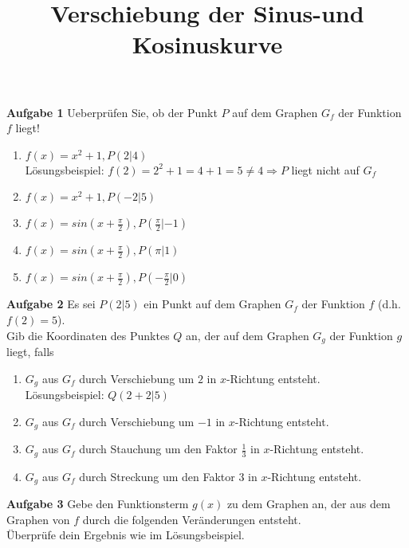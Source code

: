 \documentclass[11pt]{article}
\title{ Verschiebung der Sinus-und Kosinuskurve }
\begin{document}
\maketitle

\textbf{Aufgabe 1} Ueberpr\"ufen Sie, ob der Punkt $P$ auf dem Graphen $G_f$ der Funktion $f$ liegt!
\begin{enumerate}[label=(\alph*)]
\item $f(x)=x^2+1, P(2|4)$ \\
L\"osungsbeispiel: $f(2) = 2^2+1=4+1=5 \neq 4 \Rightarrow P$ liegt nicht auf $G_f$ 
\item $f(x)=x^2+1, P(-2|5)$ 
\item $f(x)=sin\left( x + \frac{\pi}{2} \right), P\left( \frac{\pi}{2} | -1 \right)$
\item $f(x)=sin\left( x + \frac{\pi}{2} \right), P\left( \pi | 1 \right)$
\item $f(x)=sin\left( x + \frac{\pi}{2} \right), P\left( -\frac{\pi}{2} | 0 \right)$
\end{enumerate}

\textbf{Aufgabe 2} Es sei $P(2|5)$ ein Punkt auf dem Graphen $G_f$ der Funktion $f$ (d.h. $f(2)=5$). \\
Gib die Koordinaten des Punktes $Q$ an, der auf dem Graphen $G_g$ der Funktion $g$ liegt, falls
\begin{enumerate}[label=(\alph*)]
\item $G_g$ aus $G_f$ durch Verschiebung um $2$ in $x$-Richtung entsteht. \\
L\"osungsbeispiel: $Q(2+2|5)$
\item $G_g$ aus $G_f$ durch Verschiebung um $-1$ in $x$-Richtung entsteht.
\item $G_g$ aus $G_f$ durch Stauchung um den Faktor $\frac{1}{3}$ in $x$-Richtung entsteht. 
\item $G_g$ aus $G_f$ durch Streckung um den Faktor $3$ in $x$-Richtung entsteht.
\end{enumerate}

\textbf{Aufgabe 3} Gebe den Funktionsterm $g(x)$ zu dem Graphen an, der aus dem Graphen von $f$ durch die folgenden Ver\"anderungen entsteht. \\
\"Uberpr\"ufe dein Ergebnis wie im L\"osungsbeispiel.
\end{document}
